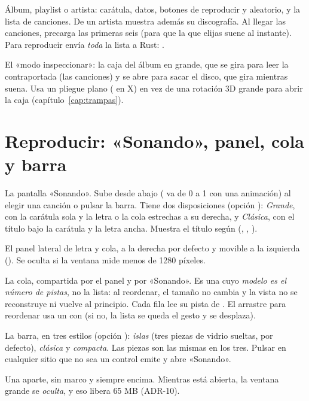\begin{description}[style=nextline, leftmargin=0pt]
  \item[\archivo{DetailView.qml}] Álbum, playlist o artista: carátula, datos, botones de
  reproducir y aleatorio, y la lista de canciones. De un artista muestra además su
  discografía. Al llegar las canciones, precarga las primeras seis (para que la que elijas
  suene al instante). Para reproducir envía \emph{toda} la lista a Rust:
  .
  \item[\archivo{InspectView.qml}] El «modo inspeccionar»: la caja del álbum en grande, que
  se gira para leer la contraportada (las canciones) y se abre para sacar el disco, que gira
  mientras suena. Usa un pliegue plano ( en X) en vez de una rotación 3D grande para
  abrir la caja (capítulo~\ref{cap:trampas}).
\end{description}

\section{Reproducir: «Sonando», panel, cola y barra}

\begin{description}[style=nextline, leftmargin=0pt]
  \item[\archivo{NowPlayingView.qml}] La pantalla «Sonando». Sube desde abajo
  ( va de 0 a 1 con una animación) al elegir una canción o pulsar la barra. Tiene
  dos disposiciones (opción ): \emph{Grande}, con la carátula sola y la letra o la
  cola estrechas a su derecha, y \emph{Clásica}, con el título bajo la carátula y la letra
  ancha. Muestra el título según  (, , ).
  \item[\archivo{NowPlayingPanel.qml}] El panel lateral de letra y cola, a la derecha por
  defecto y movible a la izquierda (). Se oculta si la ventana mide menos de 1280
  píxeles.
  \item[\archivo{QueueList.qml}] La cola, compartida por el panel y por «Sonando». Es una
   cuyo \emph{modelo es el número de pistas}, no la lista: al reordenar, el
  tamaño no cambia y la vista no se reconstruye ni vuelve al principio. Cada fila lee su pista
  de . El arrastre para reordenar usa un  con
   (si no, la lista se queda el gesto y se desplaza).
  \item[\archivo{PlayerBar.qml}] La barra, en tres estilos (opción ): \emph{islas}
  (tres piezas de vidrio sueltas, por defecto), \emph{clásica} y \emph{compacta}. Las piezas
  son las mismas en los tres. Pulsar en cualquier sitio que no sea un control emite
   y abre «Sonando».
  \item[\archivo{MiniPlayer.qml}] Una  aparte, sin marco y siempre encima. Mientras
  está abierta, la ventana grande se \emph{oculta}, y eso libera 65 MB (ADR-10).
\end{description}

